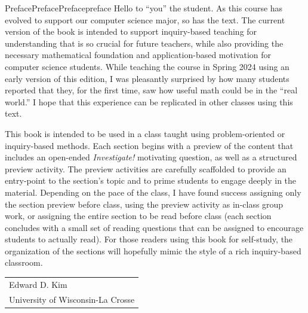\documentclass[twoside,11pt,]{book}
\numberwithin{equation}{chapter}
\begin{document}
\begin{preface}{Preface}{Preface}{}{Preface}{}{}{preface}
Hello to ``you'' the student. As this course has evolved to support our computer science major, so has the text.  The current version of the book is intended to support  inquiry-based teaching for understanding that is so crucial for future teachers, while also providing the necessary mathematical foundation and application-based motivation for computer science students.  While teaching the course in Spring 2024 using an early version of this edition, I was pleasantly surprised by how many students reported that they, for the first time, saw how useful math could be in the ``real world.''  I hope that this experience can be replicated in other classes using this text.%
\par
This book is intended to be used in a class taught using problem-oriented or inquiry-based methods.  Each section begins with a preview of the content that includes an open-ended \emph{Investigate!} motivating question, as well as a structured preview activity.  The preview activities are carefully scaffolded to provide an entry-point to the section's topic and to prime students to engage deeply in the material. Depending on the pace of the class, I have found success assigning only the section preview before class, using the preview activity as in-class group work, or assigning the entire section to be read before class (each section concludes with a small set of reading questions that can be assigned to encourage students to actually read).  For those readers using this book for self-study, the organization of the sections will hopefully mimic the style of a rich inquiry-based classroom.%
\nopagebreak\par%
\hfill\begin{tabular}[t]{l@{}}
Edward D. Kim\\
University of Wisconsin-La Crosse
\end{tabular}\\\par
\end{preface}
%
%
\typeout{************************************************}
\typeout{************************************************}
%
\end{document}
